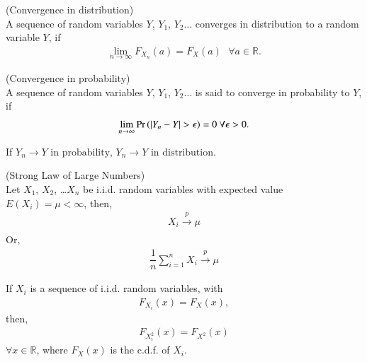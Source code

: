 \begin{definition}
    (Convergence in distribution)\\
    A sequence of random variables $Y$, $Y_1$, $Y_2 \ldots$   converges in distribution to a random variable $Y$, if
    \begin{align}
        \lim_{n \to \infty}F_{X_{n}} (a) = F_{X} (a)  \text{  }\forall a \in \mathbb{R}.
    \end{align}
\end{definition}
\begin{definition} \label{conv/2/def2}
    (Convergence in probability)\\
    A sequence of random variables $Y$, $Y_1$, $Y_2 \ldots$ is said to converge in probability to $Y$, if
    \begin{align}
        \lim_{n \to \infty}\Pr\left(\left\vert Y_n - Y\right\vert > \epsilon\right) = 0  \text{  }\forall \epsilon > 0.
    \end{align}
\end{definition}
\begin{lemma}\label{conv/2/lma1}
    If
    \begin{math}
    {Y_n} \to Y \text{ in probability, }{Y_n} \to Y \text{ in distribution.}
    \end{math}
\end{lemma}
\begin{lemma}\label{conv/2/lma3}
    (Strong Law of Large Numbers)\\ 
Let $X_1$, $X_2$, \ldots $X_n$ be i.i.d. random variables with expected value $E(X_i)=\mu < \infty$, then,
\begin{align}
X_i \xrightarrow[]{p}\mu
\end{align}
Or, 
\begin{align}
    \dfrac{1}{n}\sum_{i=1}^n X_i \xrightarrow[]{p} \mu
\end{align}
%
\end{lemma}
\begin{lemma} \label{conv/2/lmaconda}
    If $X_i$ is a sequence of i.i.d. random variables, with
    \begin{align}
        \label{conv/2/maincondA}
        F_{X_i}(x)=F_X(x),
    \end{align}
    then,
    \begin{align}
        F_{X_i^2}(x)=F_{X^2}(x)
    \end{align}
    $\forall x \in \mathbb{R}$, where $F_{X}(x)$ is the c.d.f. of $X_i$.
\end{lemma}
